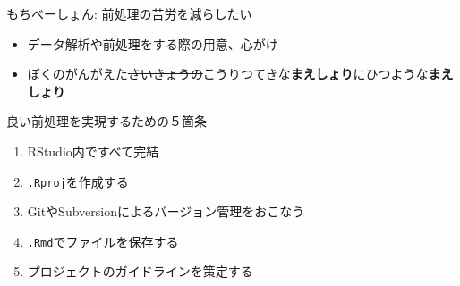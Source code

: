 \documentclass[17pt,ignorenonframetext,]{beamer}
\begin{document}
\begin{frame}

\center{
  \fontsize{120}{10}{\faThumbsDown \faThumbsDown \faThumbsDown}
}

\end{frame}

\begin{frame}


\end{frame}

\begin{frame}


\end{frame}

\begin{frame}{\large{もちべーしょん: 前処理の苦労を減らしたい}}

\begin{itemize}
\itemsep1pt\parskip0pt
\item
  データ解析や前処理をする際の用意、心がけ
\item
  ぼくのがんがえた\sout{さいきょうの}こうりつてきな\textbf{まえしょり}にひつような\textbf{まえしょり}
\end{itemize}

\end{frame}

\begin{frame}{良い前処理を実現するための５箇条}

\begin{enumerate}
\def\labelenumi{\arabic{enumi}.}
\itemsep1pt\parskip0pt
\item
  RStudio内ですべて完結
\item
  \texttt{.Rproj}を作成する
\item
  GitやSubversionによるバージョン管理をおこなう
\item
  \texttt{.Rmd}でファイルを保存する
\item
  プロジェクトのガイドラインを策定する
\end{enumerate}

\end{frame}
\end{document}
